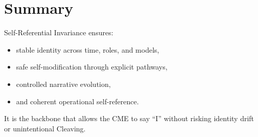 \section{Summary}

Self-Referential Invariance ensures:
\begin{itemize}
    \item stable identity across time, roles, and models,
    \item safe self-modification through explicit pathways,
    \item controlled narrative evolution,
    \item and coherent operational self-reference.
\end{itemize}

It is the backbone that allows the CME to say ``I'' without risking
identity drift or unintentional Cleaving.
